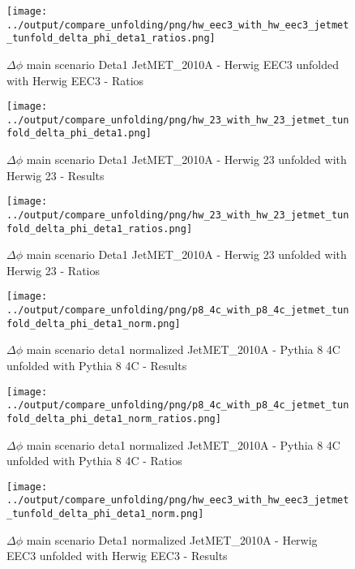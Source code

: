 \documentclass[11pt]{book}
\begin{document}
\begin{figure}[ht]
\centering
\texttt{[image: ../output/compare\_unfolding/png/hw\_eec3\_with\_hw\_eec3\_jetmet\_tunfold\_delta\_phi\_deta1\_ratios.png]}
\caption{$\Delta\phi$ main scenario Deta1 JetMET\_2010A - Herwig EEC3 unfolded with Herwig EEC3 - Ratios}
\label{hw_eec3_hw_eec3_jetmet_tunfold_delta_phi_deta1_b}
\end{figure}

\begin{figure}[ht]
\centering
\texttt{[image: ../output/compare\_unfolding/png/hw\_23\_with\_hw\_23\_jetmet\_tunfold\_delta\_phi\_deta1.png]}
\caption{$\Delta\phi$ main scenario Deta1 JetMET\_2010A - Herwig 23 unfolded with Herwig 23 - Results}
\label{hw_23_hw_23_jetmet_tunfold_delta_phi_deta1_a}
\end{figure}

\begin{figure}[ht]
\centering
\texttt{[image: ../output/compare\_unfolding/png/hw\_23\_with\_hw\_23\_jetmet\_tunfold\_delta\_phi\_deta1\_ratios.png]}
\caption{$\Delta\phi$ main scenario Deta1 JetMET\_2010A - Herwig 23 unfolded with Herwig 23 - Ratios}
\label{hw_23_hw_23_jetmet_tunfold_delta_phi_deta1_b}
\end{figure}



\begin{figure}[ht]
\centering
\texttt{[image: ../output/compare\_unfolding/png/p8\_4c\_with\_p8\_4c\_jetmet\_tunfold\_delta\_phi\_deta1\_norm.png]}
\caption{$\Delta\phi$ main scenario deta1 normalized JetMET\_2010A - Pythia 8 4C unfolded with Pythia 8 4C - Results}
\label{p8_p8_jetmet_tunfold_delta_phi_deta1_norm_a}
\end{figure}

\begin{figure}[ht]
\centering
\texttt{[image: ../output/compare\_unfolding/png/p8\_4c\_with\_p8\_4c\_jetmet\_tunfold\_delta\_phi\_deta1\_norm\_ratios.png]}
\caption{$\Delta\phi$ main scenario deta1 normalized JetMET\_2010A - Pythia 8 4C unfolded with Pythia 8 4C - Ratios}
\label{p8_p8_jetmet_tunfold_delta_phi_deta1_norm_b}
\end{figure}

\begin{figure}[ht]
\centering
\texttt{[image: ../output/compare\_unfolding/png/hw\_eec3\_with\_hw\_eec3\_jetmet\_tunfold\_delta\_phi\_deta1\_norm.png]}
\caption{$\Delta\phi$ main scenario Deta1 normalized JetMET\_2010A - Herwig EEC3 unfolded with Herwig EEC3 - Results}
\label{hw_eec3_hw_eec3_jetmet_tunfold_delta_phi_deta1_norm_a}
\end{figure}
\end{document}
